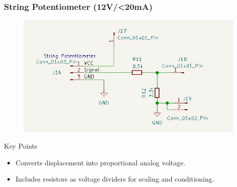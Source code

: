 \documentclass[8pt,compress]{beamer}
\begin{document}
\begin{frame}
  \frametitle{String Potentiometer  (12V/<20mA)}
  \begin{minipage}{0.65\textwidth}
    \begin{figure}
      \includegraphics[width=\textwidth]{assets/electronic/string_pcb.jpg}
    \end{figure}
  \end{minipage}
  \hfill
  \begin{minipage}{0.3\textwidth}
    \begin{block}{Key Points}
      \begin{itemize}
        \item Converts displacement into proportional analog voltage.
        \item Includes resistors as voltage dividers for scaling and conditioning.
      \end{itemize}
    \end{block}
  \end{minipage}
\end{frame}
\end{document}
